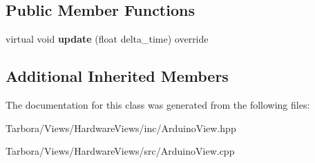 \subsection*{Public Member Functions}
\begin{DoxyCompactItemize}
\item 
\mbox{\label{classTarbora_1_1ArduinoView_a76e2e6d8fc47da1fa28fe75b80a89449}} 
virtual void {\bfseries update} (float delta\+\_\+time) override
\end{DoxyCompactItemize}
\subsection*{Additional Inherited Members}


The documentation for this class was generated from the following files\+:\begin{DoxyCompactItemize}
\item 
Tarbora/\+Views/\+Hardware\+Views/inc/Arduino\+View.\+hpp\item 
Tarbora/\+Views/\+Hardware\+Views/src/Arduino\+View.\+cpp\end{DoxyCompactItemize}
